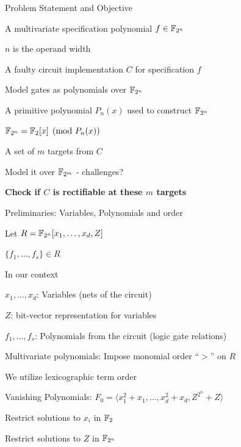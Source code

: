 \begin{frame}{\large Problem Statement and Objective}
\bi
	\item A multivariate specification polynomial $f \in {\mathbb{F}}_{2^n}$
	\bi
		\item $n$ is the operand width
	\ei 
	\pause
	\vspace{0.1in}
	\item A faulty circuit implementation $C$ for specification $f$ 
	\bi
		\item Model gates as polynomials over ${\mathbb{F}}_{2^n}$
	\ei
	\pause
	\vspace{0.1in}
	\item A primitive polynomial $P_n(x)$ used to construct ${\mathbb{F}}_{2^n}$
	\bi
		\item ${\mathbb{F}}_{2^n} = {\mathbb{F}}_2[x] \pmod{ P_n(x)}$
	\ei
	\pause
	\vspace{0.1in}
	\item A set of $m$ targets from $C$
	\bi
		\item Model it over ${\mathbb{F}}_{2^m}$ - challenges?
	\ei
	\pause 
	\vspace{0.1in}
	\vspace{0.1in}
	\item {\bf Check if $C$ is rectifiable at these $m$ targets }
\ei
\end{frame}


\begin{frame}{\large Preliminaries: Variables, Polynomials and order}
\bi
	\item Let $R={\mathbb{F}}_{2^n}[x_1,\dots,x_d,Z]$
	\bi
		\item $\{f_1, \dots, f_s\} \in R$
	\ei
	\vspace{0.1in}
	\pause
	\item In our context
	\bi
		\item $x_1,\dots,x_d$: Variables (nets of the circuit)
		\item $Z$: bit-vector representation for variables
		\item $f_1, \dots, f_s$: Polynomials from the circuit (logic gate relations)
	\ei
	\vspace{0.1in}
	\pause
	\item Multivariate polynomials: Impose monomial order ``$>$'' on $R$
	\bi
		\item We utilize lexicographic term order
	\ei
	\vspace{0.1in}
	\pause
    \item Vanishing Polynomials: $F_0 =  \langle x_1^2+x_1,\dots,x_d^2+x_d, Z^{2^n}+Z\rangle$
	\bi
		\item Restrict solutions to $x_i$ in ${\mathbb{F}}_2$
		\item Restrict solutions to $Z$ in ${\mathbb{F}}_{2^n}$
	\ei
\ei
\end{frame}

